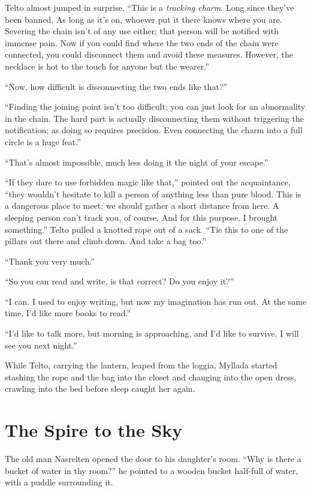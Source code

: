 Telto almost jumped in surprise. ``This is a \emph{tracking charm}. Long since they've been banned. As long as it's on, whoever put it there knows where you are. Severing the chain isn't of any use either; that person will be notified with immense pain. Now if you could find where the two ends of the chain were connected, you could disconnect them and avoid these measures. However, the necklace is hot to the touch for anyone but the wearer.''

``Now, how difficult is disconnecting the two ends like that?''

``Finding the joining point isn't too difficult; you can just look for an abnormality in the chain. The hard part is actually disconnecting them without triggering the notification; as doing so requires precision. Even connecting the charm into a full circle is a huge feat.''

``That's almost impossible, much less doing it the night of your escape.''

``If they dare to use forbidden magic like that,'' pointed out the acquaintance, ``they wouldn't hesitate to kill a person of anything less than pure blood. This is a dangerous place to meet; we should gather a short distance from here. A sleeping person can't track you, of course. And for this purpose, I brought something.'' Telto pulled a knotted rope out of a sack. ``Tie this to one of the pillars out there and climb down. And take a bag too.''

``Thank you very much.''

``So you can read and write, is that correct? Do you enjoy it?''

``I can. I used to enjoy writing, but now my imagination has run out. At the same time, I'd like more books to read.''

``I'd like to talk more, but morning is approaching, and I'd like to survive. I will see you next night.''

While Telto, carrying the lantern, leaped from the loggia, Myllada started stashing the rope and the bag into the closet and changing into the open dress, crawling into the bed before sleep caught her again.

\chapter{The Spire to the Sky}

The old man Nasrelten opened the door to his daughter's room. ``Why is there a bucket of water in thy room?'' he pointed to a wooden bucket half-full of water, with a puddle surrounding it.

